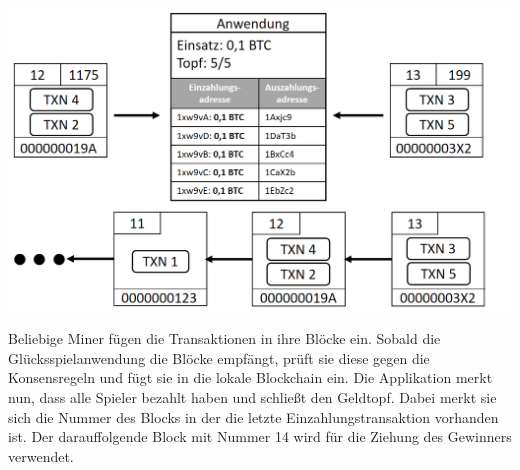 \vspace{1cm}
\begin{minipage}{0.55\textwidth}
\includegraphics[width=\textwidth]{Figures/konzept_btc/konzept8}
\centering
\decoRule
{}
\label{fig:konzept8}
\end{minipage}
\begin{minipage}{0.45\textwidth}
Beliebige Miner fügen die Transaktionen in ihre Blöcke ein. Sobald die Glücksspielanwendung die Blöcke empfängt, prüft sie diese gegen die Konsensregeln und fügt sie in die lokale Blockchain ein.
Die Applikation merkt nun, dass alle Spieler bezahlt haben und schließt den Geldtopf. Dabei merkt sie sich die Nummer des Blocks in der die letzte Einzahlungstransaktion vorhanden ist. Der darauffolgende Block mit Nummer 14 wird für die Ziehung des Gewinners verwendet.
\end{minipage}

